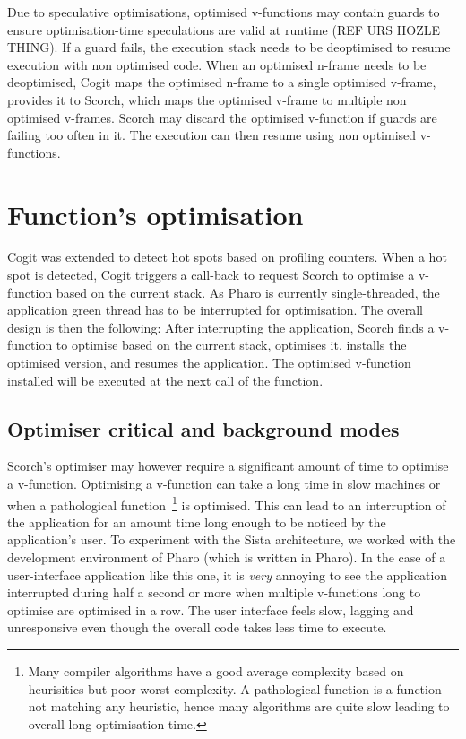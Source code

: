 \documentclass[a4paper,12pt,twoside]{../includes/ThesisStyle}
\begin{document}
Due to speculative optimisations, optimised v-functions may contain guards to ensure optimisation-time speculations are valid at runtime (REF URS HOZLE THING). If a guard fails, the execution stack needs to be deoptimised to resume execution with non optimised code. When an optimised n-frame needs to be deoptimised, Cogit maps the optimised n-frame to a single optimised v-frame, provides it to Scorch, which maps the optimised v-frame to multiple non optimised v-frames. Scorch may discard the optimised v-function if guards are failing too often in it. The execution can then resume using non optimised v-functions.


\section {Function's optimisation}

Cogit was extended to detect hot spots based on profiling counters. When a hot spot is detected, Cogit triggers a call-back to request Scorch to optimise a v-function based on the current stack. As Pharo is currently single-threaded, the application green thread has to be interrupted for optimisation. The overall design is then the following: After interrupting the application, Scorch finds a v-function to optimise based on the current stack, optimises it, installs the optimised version, and resumes the application. The optimised v-function installed will be executed at the next call of the function.

\subsection{Optimiser critical and background modes}

Scorch's optimiser may however require a significant amount of time to optimise a v-function. Optimising a v-function can take a long time in slow machines or when a pathological function~\footnote{Many compiler algorithms have a good average complexity based on heurisitics but poor worst complexity. A pathological function is a function not matching any heuristic, hence many algorithms are quite slow leading to overall long optimisation time.} is optimised. This can lead to an interruption of the application for an amount time long enough to be noticed by the application's user. To experiment with the Sista architecture, we worked with the development environment of Pharo (which is written in Pharo). In the case of a user-interface application like this one, it is \emph{very} annoying to see the application interrupted during half a second or more when multiple v-functions long to optimise are optimised in a row. The user interface feels slow, lagging and unresponsive even though the overall code takes less time to execute.
\end{document}
